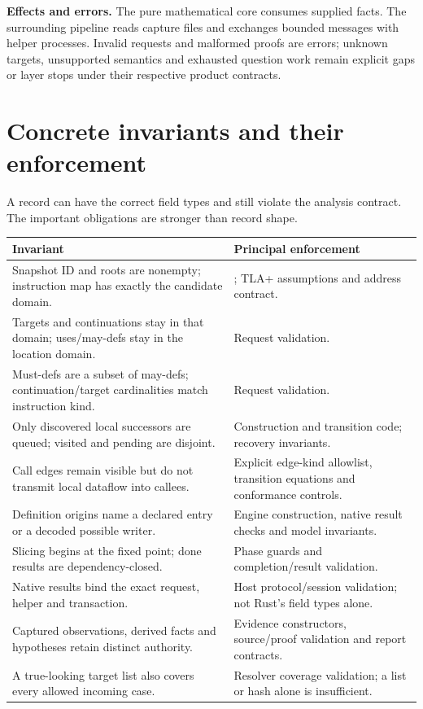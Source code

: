 \documentclass[11pt,a4paper]{article}
\newcommand{\code}[1]{\texttt{\detokenize{#1}}}
\begin{document}
\textbf{Effects and errors.} The pure mathematical core consumes supplied facts.
The surrounding pipeline reads capture files and exchanges bounded messages
with helper processes. Invalid requests and malformed proofs are errors;
unknown targets, unsupported semantics and exhausted question work remain
explicit gaps or layer stops under their respective product contracts.

\section{Concrete invariants and their enforcement}
\label{sec:invariants}
A record can have the correct field types and still violate the analysis
contract. The important obligations are stronger than record shape.

\begin{longtable}{@{}p{.57\linewidth}p{.37\linewidth}@{}}
\toprule Invariant & Principal enforcement\\\midrule\endhead
Snapshot ID and roots are nonempty; instruction map has exactly the candidate domain. & \code{AnalysisRequest::validate}; TLA+ assumptions and address contract.\\
Targets and continuations stay in that domain; uses/may-defs stay in the location domain. & Request validation.\\
Must-defs are a subset of may-defs; continuation/target cardinalities match instruction kind. & Request validation.\\
Only discovered local successors are queued; visited and pending are disjoint. & Construction and transition code; recovery invariants.\\
Call edges remain visible but do not transmit local dataflow into callees. & Explicit edge-kind allowlist, transition equations and conformance controls.\\
Definition origins name a declared entry or a decoded possible writer. & Engine construction, native result checks and model invariants.\\
Slicing begins at the fixed point; done results are dependency-closed. & Phase guards and completion/result validation.\\
Native results bind the exact request, helper and transaction. & Host protocol/session validation; not Rust's field types alone.\\
Captured observations, derived facts and hypotheses retain distinct authority. & Evidence constructors, source/proof validation and report contracts.\\
A true-looking target list also covers every allowed incoming case. & Resolver coverage validation; a list or hash alone is insufficient.\\
\bottomrule
\end{longtable}
\end{document}
